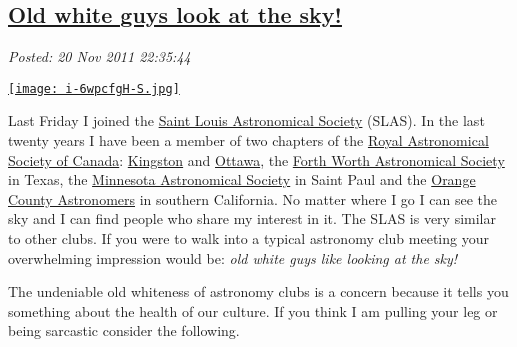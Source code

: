 %

\subsection*{\href{http://bakerjd99.wordpress.com/2011/11/20/old-white-guys-look-at-the-sky/}{Old white guys look at the sky!}}


\noindent\emph{Posted: 20 Nov 2011 22:35:44}
\vspace{6pt}

\captionsetup[floatingfigure]{labelformat=empty}
\begin{floatingfigure}[r]{0.24\textwidth}
\centering
\href{http://www.slasonline.org/}{\texttt{[image: i-6wpcfgH-S.jpg]}}
\label{fig:2151X0}
\end{floatingfigure}Last Friday I joined the \href{http://www.slasonline.org/}{Saint Louis
Astronomical Society} (SLAS). In the last twenty years I have been a
member of two chapters of the \href{http://www.rasc.ca/}{Royal
Astronomical Society of Canada}:
\href{http://kingston.rasc.ca/}{Kingston} and
\href{http://www.ottawa.rasc.ca/}{Ottawa}, the
\href{http://www.fortworthastro.com}{Forth Worth Astronomical Society}
in Texas, the \href{http://www.mnastro.org/}{Minnesota Astronomical
Society} in Saint Paul and the
\href{http://www.ocastronomers.org/}{Orange County Astronomers} in
southern California. No matter where I go I can see the sky and I can
find people who share my interest in it. The SLAS is very similar to
other clubs. If you were to walk into a typical astronomy club meeting
your overwhelming impression would be: \emph{old white guys like looking
at the sky!}

\emph{}The undeniable old whiteness of astronomy clubs is a concern
because it tells you something about the health of our culture. If you
think I am pulling your leg or being sarcastic consider the following.

